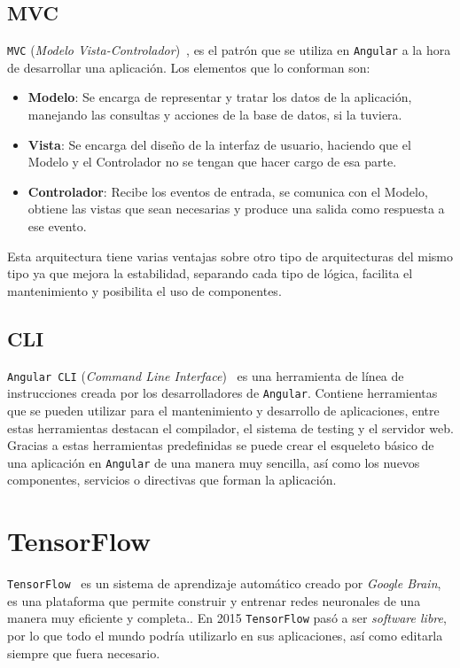 \documentclass[a4paper, 12pt]{book}
\begin{document}
\subsection{MVC}
\label{subsec:mvc}

\texttt{MVC} (\textit{Modelo Vista-Controlador})~\cite{mvc}, es el patrón que se utiliza en \texttt{Angular} a la hora de desarrollar una aplicación. Los elementos que lo conforman son:

\begin{itemize}
	\item \textbf{Modelo}: Se encarga de representar y tratar los datos de la aplicación, manejando las consultas y acciones de la base de datos, si la tuviera. 
	\item \textbf{Vista}: Se encarga del diseño de la interfaz de usuario, haciendo que el Modelo y el Controlador no se tengan que hacer cargo de esa parte.
	\item \textbf{Controlador}: Recibe los eventos de entrada, se comunica con el Modelo, obtiene las vistas que sean necesarias y produce una salida como respuesta a ese evento.
\end{itemize}

Esta arquitectura tiene varias ventajas sobre otro tipo de arquitecturas del mismo tipo ya que mejora la estabilidad, separando cada tipo de lógica, facilita el mantenimiento y posibilita el uso de componentes.

\subsection{CLI}
\label{subsec:cli}

\texttt{Angular CLI} (\textit{Command Line Interface})~\cite{angularcli} es una herramienta de línea de instrucciones creada por los desarrolladores de \texttt{Angular}. Contiene herramientas que se pueden utilizar para el mantenimiento y desarrollo de aplicaciones, entre estas herramientas destacan el compilador, el sistema de testing y el servidor web. Gracias a estas herramientas predefinidas se puede crear el esqueleto básico de una aplicación en \texttt{Angular} de una manera muy sencilla, así como los nuevos componentes, servicios o directivas que forman la aplicación.

\section{TensorFlow}
\label{sec:tensorflow}

\texttt{TensorFlow}~\cite{tensorflow} es un sistema de aprendizaje automático creado por \textit{Google Brain}, es una plataforma que permite construir y entrenar redes neuronales de una manera muy eficiente y completa.. En 2015 \texttt{TensorFlow} pasó a ser \textit{software libre}, por lo que todo el mundo podría utilizarlo en sus aplicaciones, así como editarla siempre que fuera necesario.
\end{document}
